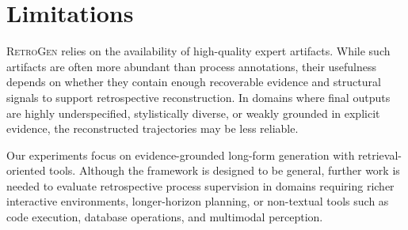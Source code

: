 \section*{Limitations}

\textsc{RetroGen} relies on the availability of high-quality expert artifacts. While such artifacts are often more abundant than process annotations, their usefulness depends on whether they contain enough recoverable evidence and structural signals to support retrospective reconstruction. In domains where final outputs are highly underspecified, stylistically diverse, or weakly grounded in explicit evidence, the reconstructed trajectories may be less reliable.

Our experiments focus on evidence-grounded long-form generation with retrieval-oriented tools. Although the framework is designed to be general, further work is needed to evaluate retrospective process supervision in domains requiring richer interactive environments, longer-horizon planning, or non-textual tools such as code execution, database operations, and multimodal perception.